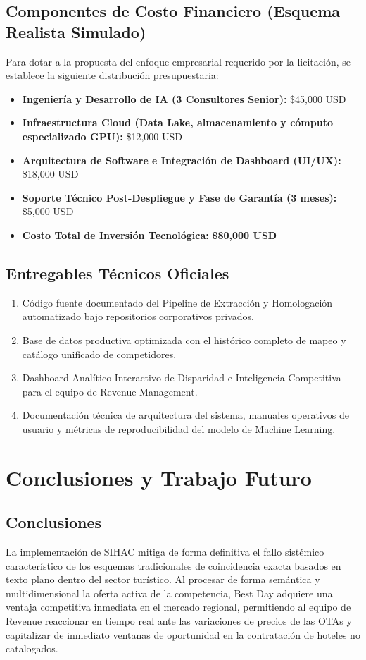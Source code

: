 \documentclass[11pt,a4paper]{article}
\begin{document}
\subsection{Componentes de Costo Financiero (Esquema Realista Simulado)}
Para dotar a la propuesta del enfoque empresarial requerido por la licitación, se establece la siguiente distribución presupuestaria:
\begin{itemize}[leftmargin=*]
    \item \textbf{Ingeniería y Desarrollo de IA (3 Consultores Senior):} \$45,000 USD
    \item \textbf{Infraestructura Cloud (Data Lake, almacenamiento y cómputo especializado GPU):} \$12,000 USD
    \item \textbf{Arquitectura de Software e Integración de Dashboard (UI/UX):} \$18,000 USD
    \item \textbf{Soporte Técnico Post-Despliegue y Fase de Garantía (3 meses):} \$5,000 USD
    \item \textbf{Costo Total de Inversión Tecnológica:} \textbf{\$80,000 USD}
\end{itemize}

\subsection{Entregables Técnicos Oficiales}
\begin{enumerate}[leftmargin=*]
    \item Código fuente documentado del Pipeline de Extracción y Homologación automatizado bajo repositorios corporativos privados.
    \item Base de datos productiva optimizada con el histórico completo de mapeo y catálogo unificado de competidores.
    \item Dashboard Analítico Interactivo de Disparidad e Inteligencia Competitiva para el equipo de Revenue Management.
    \item Documentación técnica de arquitectura del sistema, manuales operativos de usuario y métricas de reproducibilidad del modelo de Machine Learning.
\end{enumerate}

\section{Conclusiones y Trabajo Futuro}
\subsection{Conclusiones}
La implementación de SIHAC mitiga de forma definitiva el fallo sistémico característico de los esquemas tradicionales de coincidencia exacta basados en texto plano dentro del sector turístico. Al procesar de forma semántica y multidimensional la oferta activa de la competencia, Best Day adquiere una ventaja competitiva inmediata en el mercado regional, permitiendo al equipo de Revenue reaccionar en tiempo real ante las variaciones de precios de las OTAs y capitalizar de inmediato ventanas de oportunidad en la contratación de hoteles no catalogados.
\end{document}
